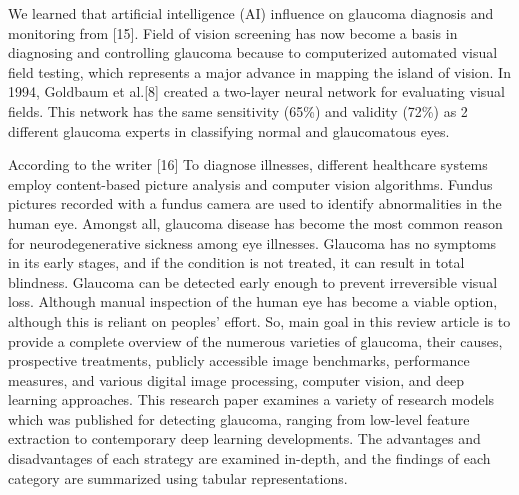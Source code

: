 \vspace{5mm}
\noindent We learned that artificial intelligence (AI) influence on glaucoma diagnosis and monitoring from [15]. Field of vision screening has now become a basis in diagnosing and controlling glaucoma because to computerized automated visual field testing, which represents a major advance in mapping the island of vision. In 1994, Goldbaum et al.[8] created a two-layer neural network for evaluating visual fields. This network has the same sensitivity (65\%) and validity (72\%) as 2 different glaucoma experts in classifying normal and glaucomatous eyes.

\vspace{5mm}
\noindent According to the writer [16] To diagnose illnesses, different healthcare systems employ content-based picture analysis and computer vision algorithms. Fundus pictures recorded with a fundus camera are used to identify abnormalities in the human eye. Amongst all, glaucoma disease has become the most common reason for neurodegenerative sickness among eye illnesses. Glaucoma has no symptoms in its early stages, and if the condition is not treated, it can result in total blindness. Glaucoma can be detected early enough to prevent irreversible visual loss. Although manual inspection of the human eye has become a viable option, although this is reliant on peoples’ effort. So, main goal in this review article is to provide a complete overview of the numerous varieties of glaucoma, their causes, prospective treatments, publicly accessible image benchmarks, performance measures, and various digital image processing, computer vision, and deep learning approaches. This research paper examines a variety of research models which was published for detecting glaucoma, ranging from low-level feature extraction to contemporary deep learning developments. The advantages and disadvantages of each strategy are examined in-depth, and the findings of each category are summarized using tabular representations.

